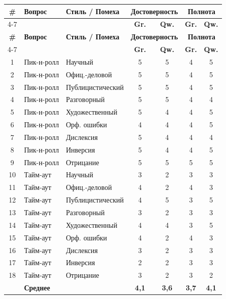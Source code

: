 \documentclass[a4paper, final]{article}
\begin{document}
\begin{longtable}{|c|p{2.6cm}|p{2.6cm}|c|c|c|c|}
\hline
\textbf{\#} & \textbf{Вопрос} & \textbf{Стиль / Помеха} & \multicolumn{2}{c|}{\textbf{Достоверность}} & \multicolumn{2}{c|}{\textbf{Полнота}} \\
\cline{4-7}
 & & & \textbf{Gr.} & \textbf{Qw.} & \textbf{Gr.} & \textbf{Qw.} \\
\hline
\endfirsthead
\hline
\textbf{\#} & \textbf{Вопрос} & \textbf{Стиль / Помеха} & \multicolumn{2}{c|}{\textbf{Достоверность}} & \multicolumn{2}{c|}{\textbf{Полнота}} \\
\cline{4-7}
 & & & \textbf{Gr.} & \textbf{Qw.} & \textbf{Gr.} & \textbf{Qw.} \\
\hline
\endhead
1  & Пик-н-ролл & Научный          & 5 & 5 & 4 & 5 \\ \hline
2  & Пик-н-ролл & Офиц.-деловой    & 5 & 5 & 4 & 5 \\ \hline
3  & Пик-н-ролл & Публицистический & 5 & 5 & 4 & 5 \\ \hline
4  & Пик-н-ролл & Разговорный      & 5 & 5 & 4 & 4 \\ \hline
5  & Пик-н-ролл & Художественный   & 5 & 4 & 4 & 5 \\ \hline
6  & Пик-н-ролл & Орф. ошибки      & 4 & 4 & 4 & 5 \\ \hline
7  & Пик-н-ролл & Дислексия        & 5 & 4 & 4 & 4 \\ \hline
8  & Пик-н-ролл & Инверсия         & 5 & 4 & 4 & 5 \\ \hline
9  & Пик-н-ролл & Отрицание        & 5 & 5 & 5 & 5 \\ \hline
10 & Тайм-аут   & Научный          & 3 & 2 & 3 & 3 \\ \hline
11 & Тайм-аут   & Офиц.-деловой    & 4 & 2 & 4 & 3 \\ \hline
12 & Тайм-аут   & Публицистический & 4 & 5 & 3 & 5 \\ \hline
13 & Тайм-аут   & Разговорный      & 3 & 2 & 3 & 3 \\ \hline
14 & Тайм-аут   & Художественный   & 4 & 4 & 3 & 5 \\ \hline
15 & Тайм-аут   & Орф. ошибки      & 4 & 2 & 4 & 3 \\ \hline
16 & Тайм-аут   & Дислексия        & 3 & 2 & 3 & 3 \\ \hline
17 & Тайм-аут   & Инверсия         & 2 & 2 & 3 & 3 \\ \hline
18 & Тайм-аут   & Отрицание        & 3 & 2 & 3 & 2 \\ \hline
   & \multicolumn{2}{l|}{\textbf{Среднее}} & \textbf{4,1} & \textbf{3,6} & \textbf{3,7} & \textbf{4,1} \\
\hline
\end{longtable}
\end{document}
